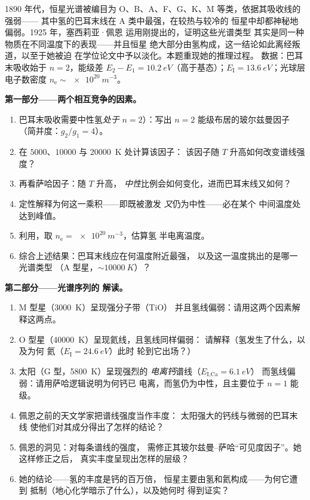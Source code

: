 \begin{problem}\label{pb:b3:grand-canonical:1}
1890 年代，恒星光谱被编目为
O、B、A、F、G、K、M 等类，依据其吸收线的强弱——
其中氢的巴耳末线在 A 类中最强，在较热与较冷的
恒星中却都神秘地偏弱。1925 年，塞西莉亚·佩恩
运用刚提出的，证明这些光谱类型
其实是同一种物质在不同温度下的表现——并且恒星
绝大部分由氢构成，这一结论如此离经叛道，以至于她被迫
在学位论文中予以淡化。本题重现她的推理过程。
数据：巴耳末吸收始于 $n = 2$，能级差 $E_2 - E_1 =
\qty{10.2}{eV}$（高于基态）；$E_{\text{I}} =
\qty{13.6}{eV}$；光球层电子数密度 $n_{\text{e}}
\sim \qty{e20}{m^{-3}}$。

\medskip\noindent\textbf{第一部分——两个相互竞争的因素。}
\begin{enumerate}
  \item 巴耳末吸收需要中性氢\emph{处于} $n =
        2$）：写出 $n = 2$ 能级布居的玻尔兹曼因子
        （简并度：$g_2/g_1 = 4$）。
  \item 在 $5000$、$10000$ 与 \qty{20000}{K} 处计算该因子：
        该因子随 $T$ 升高如何改变谱线强度？
  \item 再看萨哈因子：随 $T$ 升高，
        \emph{中性}比例会如何变化，进而巴耳末线又如何？
  \item 定性解释为何这一乘积——即既被激发
        \emph{又}仍为中性——必在某个
        中间温度处达到峰值。
  \item 利用，取 $n_{\text{e}} =
        \qty{e20}{m^{-3}}$，估算氢
        半电离温度。
  \item 综合上述结果：巴耳末线应在何温度附近最强，
        以及这一温度挑出的是哪一光谱类型
        （A 型星，$\sim\qty{10000}{K}$）？
\end{enumerate}

\medskip\noindent\textbf{第二部分——光谱序列的
解读。}
\begin{enumerate}[resume]
  \item M 型星（\qty{3000}{K}）呈现强分子带（TiO）
        并且氢线偏弱：请用这两个因素解释这两点。
  \item O 型星（\qty{40000}{K}）呈现氦线，且氢线同样偏弱：
        请解释（氢发生了什么，以及为何
        氦（$E_{\text{I}} = \qty{24.6}{eV}$）此时
        轮到它出场？）
  \item 太阳（G 型，\qty{5800}{K}）呈现强烈的
        \emph{电离钙}谱线（$E_{\text{I,Ca}} = \qty{6.1}{eV}$）
        而氢线偏弱：请用萨哈逻辑说明为何钙已
        电离，而氢仍为中性，且主要位于
        $n = 1$ 能级。
  \item 佩恩之前的天文学家把谱线强度当作丰度：
        太阳强大的钙线与微弱的巴耳末线
        使他们对其成分得出了怎样的结论？
  \item 佩恩的洞见：对每条谱线的强度，
        需修正其玻尔兹曼–萨哈“可见度因子”。她这样修正之后，
        真实丰度呈现出怎样的层级？
  \item 她的结论——氢的丰度是钙的百万倍，
        恒星主要由氢和氦构成——为何它遭到
        抵制（地心化学暗示了什么），以及她何时
        得到证实？
\end{enumerate}


\end{problem}
